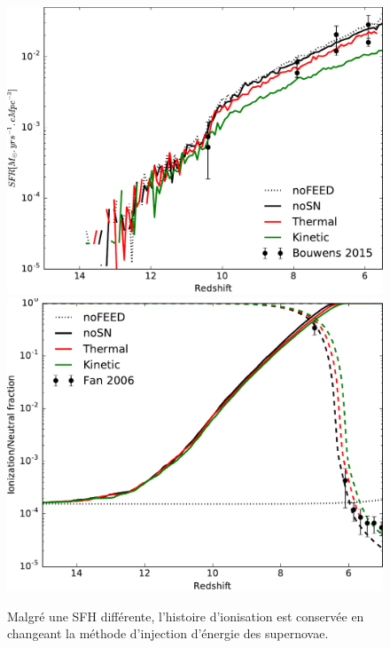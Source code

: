 \begin{figure}
        \includegraphics[width=.95\textwidth]{img/03/sedov/SFRmethode.pdf} 
        \includegraphics[width=.95\textwidth]{img/03/xion.pdf} 
        \caption[Fonction d'ionisation en fonction de la quantité d'énergie injectée]{Malgré une \ac{SFH} différente, l'histoire d'ionisation est conservée en changeant la méthode d'injection d'énergie des supernovae.
        }
 		\label{fig:xion_sneff}
\end{figure}


